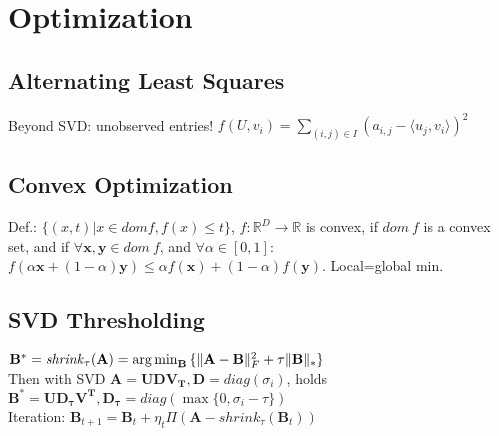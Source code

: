 \section{Optimization}

\subsection*{Alternating Least Squares}
Beyond SVD: unobserved entries! $f(U,v_i)=\sum_{(i,j)\in I} (a_{i,j} - \langle u_j, v_i \rangle)^2$\\
\vspace{40mm}

\subsection*{Convex Optimization}
Def.: $\{(x,t)|x \in dom f, f(x) \leq t\}$, $f : \mathbb{R}^D \rightarrow \mathbb{R}$ is convex, if $dom\ f$ is a convex set, and if $\forall \mathbf{x}, \mathbf{y} \in dom\ f$, and $\forall \alpha\in[0,1]$: $f(\alpha \mathbf{x} + (1 - \alpha)\mathbf{y}) \leq \alpha f(\mathbf{x}) + (1-\alpha)f(\mathbf{y})$. Local=global min.

\subsection*{SVD Thresholding}
$\mathbf{B}^{*}=\mathit{shrink}_\tau(\mathbf{A})=\operatorname*{arg\,min}_{\mathbf{B}}{\{\|\mathbf{A-B}\|^2_F + \tau\|\mathbf{B}\|_{*}\}}$\\
Then with SVD $\mathbf{A=UDV_T}, \mathbf{D}=\mathit{diag}(\sigma_i)$, holds $\mathbf{B^*=UD_\tau V^T, D_\tau} = \mathit{diag}(\max\{0,\sigma_i - \tau\})$ \\
Iteration: $\mathbf{B}_{t+1}=\mathbf{B}_t + \eta_t \Pi(\mathbf{A} - \mathit{shrink}_\tau(\mathbf{B}_t))$
